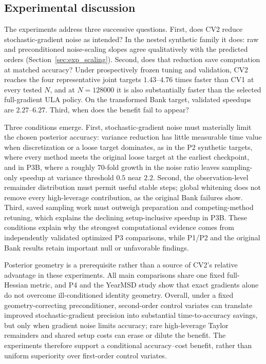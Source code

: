\subsection{Experimental discussion}\label{sec:exp_discussion}
The experiments address three successive questions. First, does CV2 reduce stochastic-gradient noise as intended? In the nested synthetic family it does: raw and preconditioned noise-scaling slopes agree qualitatively with the predicted orders (Section~\ref{sec:exp_scaling}). Second, does that reduction save computation at matched accuracy? Under prospectively frozen tuning and validation, CV2 reaches the four representative joint targets $1.43$--$4.76$ times faster than CV1 at every tested $N$, and at $N=128000$ it is also substantially faster than the selected full-gradient ULA policy. On the transformed Bank target, validated speedups are $2.27$--$6.27$. Third, when does the benefit fail to appear?

Three conditions emerge. First, stochastic-gradient noise must materially limit the chosen posterior accuracy: variance reduction has little measurable time value when discretization or a loose target dominates, as in the P2 synthetic targets, where every method meets the original loose target at the earliest checkpoint, and in P3B, where a roughly $70$-fold growth in the noise ratio leaves sampling-only speedup at variance threshold $0.5$ near $2.2$. Second, the observation-level remainder distribution must permit useful stable steps; global whitening does not remove every high-leverage contribution, as the original Bank failures show. Third, saved sampling work must outweigh preparation and competing-method retuning, which explains the declining setup-inclusive speedup in P3B. These conditions explain why the strongest computational evidence comes from independently validated optimized P3 comparisons, while P1/P2 and the original Bank results retain important null or unfavorable findings.

Posterior geometry is a prerequisite rather than a source of CV2's relative advantage in these experiments. All main comparisons share one fixed full-Hessian metric, and P4 and the YearMSD study show that exact gradients alone do not overcome ill-conditioned identity geometry. Overall, under a fixed geometry-correcting preconditioner, second-order control variates can translate improved stochastic-gradient precision into substantial time-to-accuracy savings, but only when gradient noise limits accuracy; rare high-leverage Taylor remainders and shared setup costs can erase or dilute the benefit. The experiments therefore support a conditional accuracy--cost benefit, rather than uniform superiority over first-order control variates.

